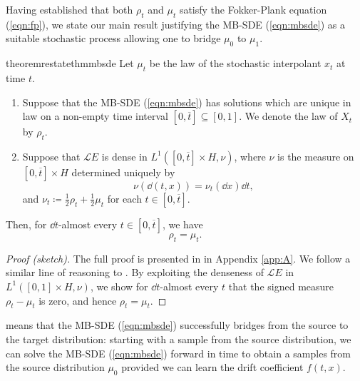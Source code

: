 Having established that both \(\rho_{t}\) and \(\mu_{t}\) satisfy the Fokker-Plank equation (\ref{eqn:fp}), we state our main result justifying the MB-SDE (\ref{eqn:mbsde}) as a suitable stochastic process allowing one to bridge \(\mu_{0}\) to \(\mu_{1}\).
\begin{theorembox}
  \begin{restatable}{theorem}{restatethmmbsde}\label{thm:mbsde}
    Let \(\mu_{t}\) be the law of the stochastic interpolant \(x_{t}\) at time \(t\).
    \begin{enumerate}
      \item \label{ass:uniquelaw} Suppose that the MB-SDE (\ref{eqn:mbsde}) has solutions which are unique in law on a non-empty time interval \([0, \overline{t}] \subseteq [0, 1]\). We denote the law of \(X_{t}\) by \(\rho_{t}\).
      \item \label{ass:densespace} Suppose that \(\mathcal{L}E\) is dense in \(L^{1}([0, \overline{t} ]\times H, \nu)\), where \(\nu\) is the measure on \([0, \overline{t}] \times H\) determined uniquely by
        \[
          \nu(\dd{(t, x)}) = \nu_{t}(\dd{x}) \dd{t},
        \]
        and \(\nu_{t} \coloneqq \frac{1}{2} \rho_{t} + \frac{1}{2} \mu_{t}\) for each \(t \in [0, \overline{t}]\).

    \end{enumerate}

    Then, for \(\dd{t}\)-almost every \(t \in [0, \overline{t}]\), we have
    \[
      \rho_{t} = \mu_{t}.
    \]
  \end{restatable}
\end{theorembox}
\begin{proof}[Proof (sketch)]
  The full proof is presented in  in Appendix \ref{app:A}. We follow a similar line of reasoning to \citet{bogachev2010uniquenesssolutionsfokkerplanckequations}. By exploiting the denseness of \(\mathcal{L}E\) in \(L^{1}([0, 1] \times H, \nu)\), we show for \(\dd{t}\)-almost every \(t\) that the signed measure \(\rho_{t} - \mu_{t}\) is zero, and hence \(\rho_{t} = \mu_{t}\).
\end{proof}

 means that the MB-SDE (\ref{eqn:mbsde}) successfully bridges from the source to the target distribution: starting with a sample from the source distribution, we can solve the MB-SDE (\ref{eqn:mbsde}) forward in time to obtain a samples from the source distribution \(\mu_{0}\) provided we can learn the drift coefficient \(f(t, x)\).


